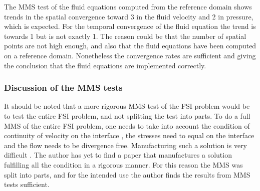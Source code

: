 The MMS test of the fluid equations computed from the reference domain shows trends in the spatial convergence toward 3 in the fluid velocity and 2 in pressure, which is expected. For the temporal convergence of the fluid equation the trend is towards 1 but is not exactly 1. The reason could be that the number of spatial points are not high enough, and also that the fluid equations have been computed on a reference domain. Nonetheless the convergence rates are sufficient and giving the conclusion that the fluid equations are implemented correctly.

\subsubsection*{Discussion of the MMS tests}

It should be noted that a more rigorous MMS test of the FSI problem would be to test the entire FSI problem, and not splitting the test into parts. To do a full MMS of the entire FSI problem, one needs to take into account the condition of continuity of velocity on the interface \cite{Etienne2006}, the stresses need to equal on the interface and the flow needs to be divergence free. Manufacturing such a solution is very difficult \cite{Etienne2012}. The author has yet to find a paper that manufactures a solution fulfilling all the condition in a rigorous manner. For this reason the MMS was split into parts, and for the intended use the author finds the results from MMS tests sufficient.

